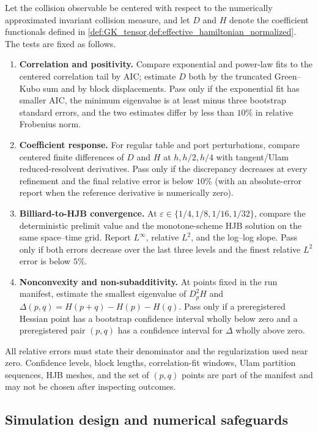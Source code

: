 \documentclass[12pt, letterpaper]{amsart}
\theoremstyle{plain}
\theoremstyle{definition}
\theoremstyle{remark}
\begin{document}
Let the collision observable be centered with respect to the numerically
approximated invariant collision measure, and let $D$ and $H$ denote the
coefficient functionals defined in \cref{def:GK_tensor,def:effective_hamiltonian_normalized}.
The tests are fixed as follows.
\begin{enumerate}[label=\textup{C\arabic*}, wide, labelindent=0pt]
    \item \textbf{Correlation and positivity.}  Compare exponential and
    power-law fits to the centered correlation tail by AIC; estimate $D$ both
    by the truncated Green--Kubo sum and by block displacements.  Pass only if
    the exponential fit has smaller AIC, the minimum eigenvalue is at least
    minus three bootstrap standard errors, and the two estimates differ by
    less than $10\%$ in relative Frobenius norm.
    \item \textbf{Coefficient response.}  For regular table and port
    perturbations, compare centered finite differences of $D$ and $H$ at
    $h,h/2,h/4$ with tangent/Ulam reduced-resolvent derivatives.  Pass only if
    the discrepancy decreases at every refinement and the final relative error
    is below $10\%$ (with an absolute-error report when the reference derivative
    is numerically zero).
    \item \textbf{Billiard-to-HJB convergence.}  At
    $\varepsilon\in\{1/4,1/8,1/16,1/32\}$, compare the deterministic prelimit
    value and the monotone-scheme HJB solution on the same space--time grid.
    Report $L^\infty$, relative $L^2$, and the log--log slope.  Pass only if both
    errors decrease over the last three levels and the finest relative $L^2$
    error is below $5\%$.
    \item \textbf{Nonconvexity and non-subadditivity.}  At points fixed in the
    run manifest, estimate the smallest eigenvalue of $D_p^2H$ and
    $\Delta(p,q)=H(p+q)-H(p)-H(q)$.  Pass only if a preregistered Hessian point
    has a bootstrap confidence interval wholly below zero and a preregistered
    pair $(p,q)$ has a confidence interval for $\Delta$ wholly above zero.
\end{enumerate}
All relative errors must state their denominator and the regularization used
near zero.  Confidence levels, block lengths, correlation-fit windows, Ulam
partition sequences, HJB meshes, and the set of $(p,q)$ points are part of the
manifest and may not be chosen after inspecting outcomes.

\subsection{Simulation design and numerical safeguards}
\end{document}
